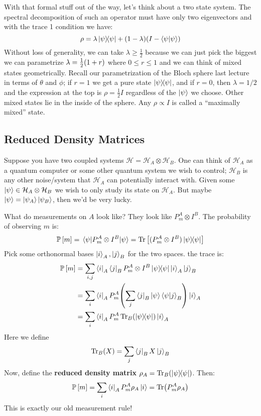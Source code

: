 With that formal stuff out of the way, let's think about a two state system. The spectral decomposition
of such an operator must have only two eigenvectors and with the trace 1 condition we have:
\[ \rho = \lambda \ketbra{\psi}{\psi} + (1 - \lambda)(I - \braket{\psi}{\psi}) \]
Without loss of generality, we can take $\lambda \geq \frac{1}{2}$ because we can just pick the biggest
we can parametrize $\lambda = \frac{1}{2} \qty(1 + r)$ where $0 \leq r \leq 1$ and we can think of
mixed states geometrically. Recall our parametrization of the Bloch sphere last lecture in terms of $\theta$ and $\phi$;
if $r = 1$ we get a pure state $\ketbra{\psi}{\psi}$, and if $r = 0$, then $\lambda = 1/2$ and the expression at the top is $\rho = \frac{1}{2} I$
regardless of the $\ket{\psi}$ we choose. Other mixed states lie in the inside of the sphere. Any $\rho \propto I$ is called a
``maximally mixed'' state.

\subsection{Reduced Density Matrices}
Suppose you have two coupled systems $\mathcal{H} = \mathcal{H}_A \otimes \mathcal{H}_B$. One can think
of $\mathcal{H}_A$ as a quantum computer or some other quantum system we wish to control; $\mathcal{H}_B$ is any other
noise/system that $\mathcal{H}_A$ can potentially interact with. Given some $\ket{\psi} \in \mathcal{H}_A \otimes \mathcal{H}_B$
we wish to only study its state on $\mathcal{H}_A$. But maybe $\ket{\psi} = \ket{\psi_A} \ket{\psi_B}$, then we'd be very lucky.

What do measurements on $A$ look like? They look like $P_m^{A} \otimes I^B$. The probability of observing $m$ is:
\[ \mathbb{P}\left[ m \right] = \mel{\psi}{P_m^A \otimes I^B}{\psi} = \Tr\qty[(P_m^A \otimes I^B) \ketbra{\psi}{\psi}] \]
Pick some orthonormal bases $\ket{i}_A, \ket{j}_B$ for the two spaces. the trace is:
\begin{align*}
    \mathbb{P}\left[ m \right] &= \sum_{i, j} \bra{i}_A \bra{j}_B P_m^A \otimes I^B \ketbra{\psi}{\psi} \ket{i}_A \ket{j}_B \\
    &= \sum_{i} \bra{i}_A P_m^A \qty(\sum_j \bra{j}_B\ket{\psi} \bra{\psi} \ket{j}_B) \ket{i}_A \\
    &= \sum_{i} \bra{i}_A P_m^A \Tr_B(\ketbra{\psi}{\psi}) \ket{i}_A
\end{align*}
Here we define 
\[ \Tr_B(X) = \sum_j \bra{j}_B X \ket{j}_B \]
Now, define the \textbf{reduced density matrix} $\rho_A = \Tr_B(\ketbra{\psi}{\psi})$. Then:
\[ \mathbb{P}\left[ m \right] = \sum_i \bra{i}_A P_m^A \rho_A \ket{i} = \Tr(P_m^A \rho_A) \]
This is exactly our old measurement rule!


